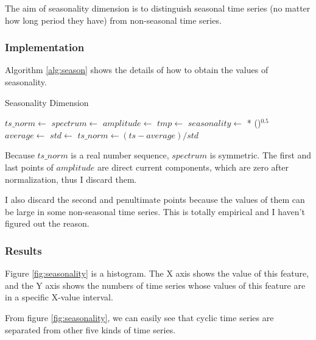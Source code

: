 \documentclass[a4paper]{article}
\begin{document}
The aim of seasonality dimension is to distinguish seasonal time series (no matter how long period they have) from non-seasonal time series.
\subsubsection{Implementation}
Algorithm \ref{alg:season} shows the details of how to obtain the values of seasonality.

\begin{algorithm}
\caption{Seasonality Dimension} \label{alg:season}
\begin{algorithmic}[1] 
	\State $ts\_norm \gets$ 
	\State $spectrum \gets$ 
	\State $amplitude \gets$ 
	\State $tmp \gets$ 
	\State $seasonality \gets$  ()$^{0.5}$
	\State
		\State $average \gets$ 
		\State $std \gets$ 
		\State $ts\_norm \gets (ts - average) / std$
		\State {}
	\EndFunction
\end{algorithmic}
\end{algorithm}

Because $ts\_norm$ is a real number sequence, $spectrum$ is symmetric. The first and last points of $amplitude$ are direct current components, which are zero after normalization, thus I discard them. 

I also discard the second and penultimate points because the values of them can be large in some non-seasonal time series. This is totally empirical and I haven't figured out the reason.

\subsubsection{Results}
Figure \ref{fig:seasonality} is a histogram. The X axis shows the value of this feature, and the Y axis shows the numbers of time series whose values of this feature are in a specific X-value interval.

From figure \ref{fig:seasonality}, we can easily see that cyclic time series are separated from other five kinds of time series.
\end{document}
